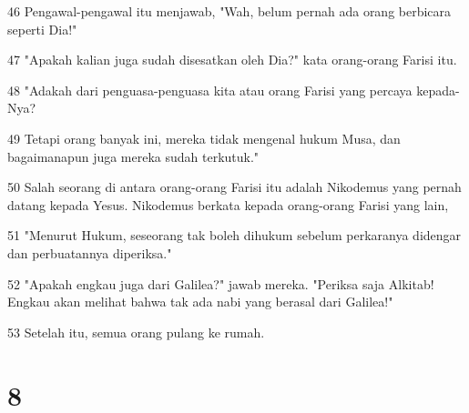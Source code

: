 \par 46 Pengawal-pengawal itu menjawab, "Wah, belum pernah ada orang berbicara seperti Dia!"
\par 47 "Apakah kalian juga sudah disesatkan oleh Dia?" kata orang-orang Farisi itu.
\par 48 "Adakah dari penguasa-penguasa kita atau orang Farisi yang percaya kepada-Nya?
\par 49 Tetapi orang banyak ini, mereka tidak mengenal hukum Musa, dan bagaimanapun juga mereka sudah terkutuk."
\par 50 Salah seorang di antara orang-orang Farisi itu adalah Nikodemus yang pernah datang kepada Yesus. Nikodemus berkata kepada orang-orang Farisi yang lain,
\par 51 "Menurut Hukum, seseorang tak boleh dihukum sebelum perkaranya didengar dan perbuatannya diperiksa."
\par 52 "Apakah engkau juga dari Galilea?" jawab mereka. "Periksa saja Alkitab! Engkau akan melihat bahwa tak ada nabi yang berasal dari Galilea!"
\par 53 Setelah itu, semua orang pulang ke rumah.

\chapter{8}

